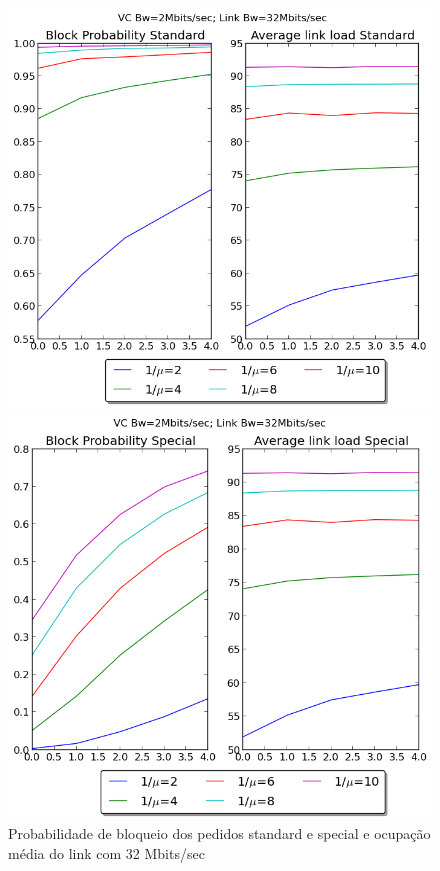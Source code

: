 \documentclass[pdftex,12pt,a4paper]{report}
\begin{document}
\newpage
\begin{figure}[!htb]
  \centering
  \begin{minipage}[b]{0.4\textwidth}
    \includegraphics[width=\textwidth]{imagensGuia/graphstandard5ex3.png}
  \end{minipage}
  \hfill
  \begin{minipage}[b]{0.4\textwidth}
    \includegraphics[width=\textwidth]{imagensGuia/graphspecial6ex3}
  \end{minipage}
  \caption{Probabilidade de bloqueio dos pedidos standard e special e ocupação média do link com 32 Mbits/sec}
\end{figure}
\end{document}

